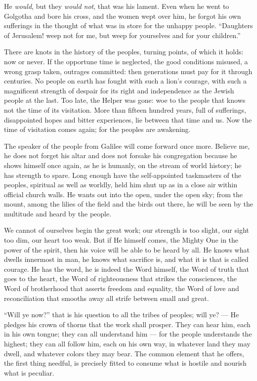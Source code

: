\documentclass[12pt,a4paper,openany]{book}
\newcommand{\opage}[1]{\marginnote{\footnotesize\textit{[#1]}}}
\newcounter{lect}
\begin{document}
He \emph{would}, but they \emph{would not}, that was his lament. Even when he went to Golgotha and bore his cross, and the women wept over him, he forgot his own sufferings in the thought of what was in store for the unhappy people. ``Daughters of Jerusalem! weep not for me, but weep for yourselves and for your children.''

There are knots in the history of the peoples, turning points, of which it holds: now or never. If the opportune time is neglected, the good conditions misused, a wrong grasp taken, outrages committed: then generations must pay for it through centuries. No people on earth has fought with such a lion's courage, with such a magnificent strength of despair for its right and
\setcounter{footnote}{0}%
\opage{33}independence as the Jewish people at the last. Too late, the Helper was gone: woe to the people that knows not the time of its visitation. More than fifteen hundred years, full of sufferings, disappointed hopes and bitter experiences, lie between that time and us. Now the time of visitation comes again; for the peoples are awakening.

The speaker of the people from Galilee will come forward once more. Believe me, he does not forget his altar and does not forsake his congregation because he shows himself once again, as he is humanly, on the stream of world history; he has strength to spare. Long enough have the self-appointed taskmasters of the peoples, spiritual as well as worldly, held him shut up as in a close air within official church walls. He wants out into the open, under the open sky; from the mount, among the lilies of the field and the birds out there, he will be seen by the multitude and heard by the people.

We cannot of ourselves begin the great work; our strength is too slight, our sight too dim, our heart too weak. But if He himself comes, the Mighty One in the power of the spirit, then his voice will be able to be heard by all. He knows what dwells innermost in man, he knows what sacrifice is, and what it is that is called courage. He has the word, he is indeed the Word himself, the Word of truth that goes to the heart, the Word of righteousness that strikes the consciences, the Word of brotherhood that asserts freedom and equality, the Word of love and reconciliation that smooths away all strife between small and great.

``Will ye now?'' that is his question to all the tribes of peoples; will ye? --- He pledges his crown of thorns that the work shall prosper. They can hear
\setcounter{footnote}{0}%
\opage{34}him, each in his own tongue; they can all understand him --- for the people understands the highest; they can all follow him, each on his own way, in whatever land they may dwell, and whatever colors they may bear. The common element that he offers, the first thing needful, is precisely fitted to consume what is hostile and nourish what is peculiar.
\end{document}
